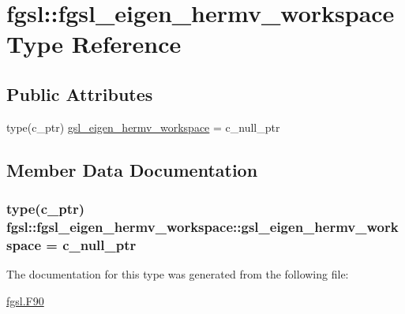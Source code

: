 \hypertarget{structfgsl_1_1fgsl__eigen__hermv__workspace}{\section{fgsl\-:\-:fgsl\-\_\-eigen\-\_\-hermv\-\_\-workspace Type Reference}
\label{structfgsl_1_1fgsl__eigen__hermv__workspace}
}
\subsection*{Public Attributes}
\begin{DoxyCompactItemize}
\item 
type(c\-\_\-ptr) \hyperlink{structfgsl_1_1fgsl__eigen__hermv__workspace_a54b4d23aaeb797865f2e898cb8022888}{gsl\-\_\-eigen\-\_\-hermv\-\_\-workspace} = c\-\_\-null\-\_\-ptr
\end{DoxyCompactItemize}


\subsection{Member Data Documentation}
\hypertarget{structfgsl_1_1fgsl__eigen__hermv__workspace_a54b4d23aaeb797865f2e898cb8022888}{
\subsubsection[{gsl\-\_\-eigen\-\_\-hermv\-\_\-workspace}]{\setlength{\rightskip}{0pt plus 5cm}type(c\-\_\-ptr) fgsl\-::fgsl\-\_\-eigen\-\_\-hermv\-\_\-workspace\-::gsl\-\_\-eigen\-\_\-hermv\-\_\-workspace = c\-\_\-null\-\_\-ptr}}\label{structfgsl_1_1fgsl__eigen__hermv__workspace_a54b4d23aaeb797865f2e898cb8022888}


The documentation for this type was generated from the following file\-:\begin{DoxyCompactItemize}
\item 
\hyperlink{fgsl_8F90}{fgsl.\-F90}\end{DoxyCompactItemize}
